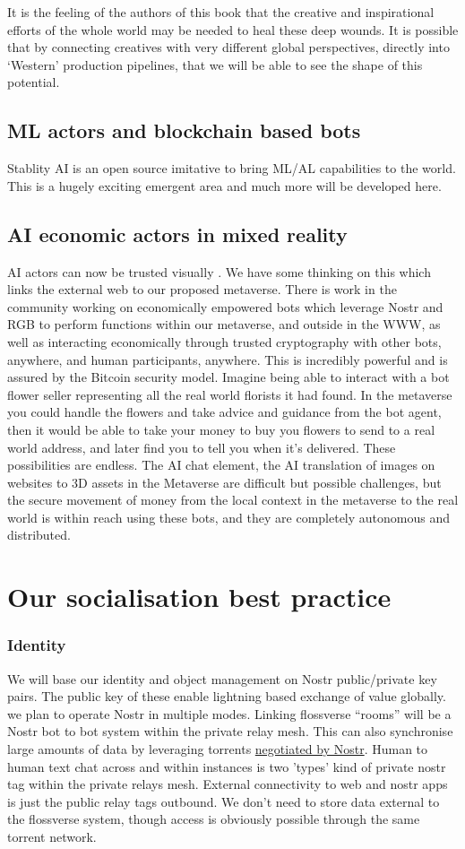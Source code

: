 It is the feeling of the authors of this book that the creative and inspirational efforts of the whole world may be needed to heal these deep wounds. It is possible that by connecting creatives with very different global perspectives, directly into `Western' production pipelines, that we will be able to see the shape of this potential.
\subsection{ML actors and blockchain based bots}
Stablity AI is an open source imitative to bring ML/AL capabilities to the world. This is a hugely exciting emergent area and much more will be developed here.
\subsection{AI economic actors in mixed reality}
AI actors can now be trusted visually \cite{nightingale2022ai}. We have some thinking on this which links the external web to our proposed metaverse. There is work in the community working on economically empowered bots which leverage Nostr and RGB to perform functions within our metaverse, and outside in the WWW, as well as interacting economically through trusted cryptography with other bots, anywhere, and human participants, anywhere. This is incredibly powerful and is assured by the Bitcoin security model. Imagine being able to interact with a bot flower seller representing all the real world florists it had found. In the metaverse you could handle the flowers and take advice and guidance from the bot agent, then it would be able to take your money to buy you flowers to send to a real world address, and later find you to tell you when it's delivered. These possibilities are endless. The AI chat element, the AI translation of images on websites to 3D assets in the Metaverse are difficult but possible challenges, but the secure movement of money from the local context in the metaverse to the real world is within reach using these bots, and they are completely autonomous and distributed.
\section{Our socialisation best practice}
\subsubsection{Identity}
We will base our identity and object management on Nostr public/private key pairs. The public key of these enable lightning based exchange of value globally. %
we plan to operate Nostr in multiple modes. Linking flossverse ``rooms'' will be a Nostr bot to bot system within the private relay mesh. This can also synchronise large amounts of data by leveraging torrents \href{https://iris.to/#/settings}{negotiated by Nostr}. Human to human text chat across and within instances is two 'types' kind of private nostr tag within the private relays mesh. External connectivity to web and nostr apps is just the public relay tags outbound. We don't need to store data external to the flossverse system, though access is obviously possible through the same torrent network.
